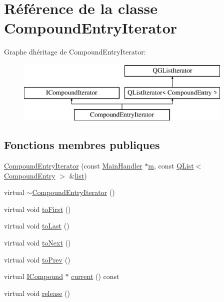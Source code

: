 \hypertarget{class_compound_entry_iterator}{}\section{Référence de la classe Compound\+Entry\+Iterator}
\label{class_compound_entry_iterator}
Graphe d\textquotesingle{}héritage de Compound\+Entry\+Iterator\+:\begin{figure}[H]
\begin{center}
\leavevmode
\includegraphics[height=3.000000cm]{class_compound_entry_iterator}
\end{center}
\end{figure}
\subsection*{Fonctions membres publiques}
\begin{DoxyCompactItemize}
\item 
\hyperlink{class_compound_entry_iterator_a673615130f4d334cfde941c95c8fa385}{Compound\+Entry\+Iterator} (const \hyperlink{class_main_handler}{Main\+Handler} $\ast$\hyperlink{060__command__switch_8tcl_a78d127e8bda64d4471ac811ad512fbd9}{m}, const \hyperlink{class_q_list}{Q\+List}$<$ \hyperlink{struct_compound_entry}{Compound\+Entry} $>$ \&\hyperlink{class_q_g_list_iterator_a6e606950ab50b273e8370d9e24756bf2}{list})
\item 
virtual \hyperlink{class_compound_entry_iterator_a243d3c053721acd38ba5cf3c2b99085e}{$\sim$\+Compound\+Entry\+Iterator} ()
\item 
virtual void \hyperlink{class_compound_entry_iterator_ac0c931ca6b03d0a480a7afc2fe5df098}{to\+First} ()
\item 
virtual void \hyperlink{class_compound_entry_iterator_a3470608126a8d522d6d4e6ab6d8366ce}{to\+Last} ()
\item 
virtual void \hyperlink{class_compound_entry_iterator_a09b3421fa6919dc0bc734203e443275e}{to\+Next} ()
\item 
virtual void \hyperlink{class_compound_entry_iterator_a66161e55a8f8ec34bf26fdffbdbb75f0}{to\+Prev} ()
\item 
virtual \hyperlink{class_i_compound}{I\+Compound} $\ast$ \hyperlink{class_compound_entry_iterator_ae19fd1ea7db6dacfde29ca3a22df791a}{current} () const 
\item 
virtual void \hyperlink{class_compound_entry_iterator_a0eb539c56c7226863cf5529f4b6e18e8}{release} ()
\end{DoxyCompactItemize}
